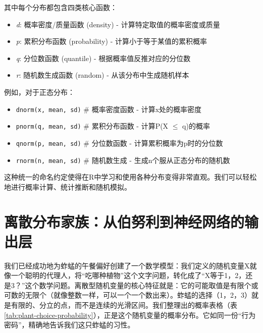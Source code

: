 \documentclass[
  twoside,12pt,fontset=none]{ctexbook}
\providecommand{\tightlist}{%
  \setlength{\itemsep}{0pt}\setlength{\parskip}{0pt}}
\begin{document}
其中每个分布都包含四类核心函数：

\begin{itemize}
\tightlist
\item
  \emph{d}: 概率密度/质量函数 (density) - 计算特定取值的概率密度或质量\\
\item
  \emph{p}: 累积分布函数 (probability) - 计算小于等于某值的累积概率\\
\item
  \emph{q}: 分位数函数 (quantile) - 根据概率值反推对应的分位数\\
\item
  \emph{r}: 随机数生成函数 (random) - 从该分布中生成随机样本
\end{itemize}

例如，对于正态分布：

\begin{itemize}
\tightlist
\item
  \texttt{dnorm(x,\ mean,\ sd)} \# 概率密度函数 - 计算x处的概率密度\\
\item
  \texttt{pnorm(q,\ mean,\ sd)} \# 累积分布函数 - 计算P(X \(\leq\) q)的概率\\
\item
  \texttt{qnorm(p,\ mean,\ sd)} \# 分位数函数 - 计算累积概率为p时的分位数\\
\item
  \texttt{rnorm(n,\ mean,\ sd)} \# 随机数生成 - 生成n个服从正态分布的随机数
\end{itemize}

这种统一的命名约定使得在R中学习和使用各种分布变得非常直观。我们可以轻松地进行概率计算、统计推断和随机模拟。

\hypertarget{ux79bbux6563ux5206ux5e03ux5bb6ux65cfux4eceux4f2fux52aaux5229ux5230ux795eux7ecfux7f51ux7edcux7684ux8f93ux51faux5c42}{%
\section{离散分布家族：从伯努利到神经网络的输出层}\label{ux79bbux6563ux5206ux5e03ux5bb6ux65cfux4eceux4f2fux52aaux5229ux5230ux795eux7ecfux7f51ux7edcux7684ux8f93ux51faux5c42}}

我们已经成功地为蚱蜢的午餐偏好创建了一个数学模型：我们定义的随机变量X就像一个聪明的代理人，将``吃哪种植物''这个文字问题，转化成了``X等于1，2，还是3？''这个数学问题。离散型随机变量的核心特征就是：它的可能取值是有限个或可数的无限个（就像整数一样，可以一个一个数出来）。蚱蜢的选择（1，2，3）就是有限的、分立的点，而不是连续的光滑区间。我们整理出的概率表格（表\ref{tab:plant-choice-probability}），正是这个随机变量的概率分布。它如同一份``行为密码''，精确地告诉我们这只蚱蜢的习性。
\end{document}
